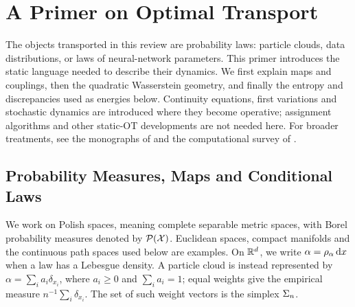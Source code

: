
\section{A Primer on Optimal Transport}
\label{sec-primer-ot}

The objects transported in this review are probability laws: particle clouds, data distributions, or laws of neural-network parameters. This primer introduces the static language needed to describe their dynamics. We first explain maps and couplings, then the quadratic Wasserstein geometry, and finally the entropy and discrepancies used as energies below. Continuity equations, first variations and stochastic dynamics are introduced where they become operative; assignment algorithms and other static-OT developments are not needed here. For broader treatments, see the monographs of \citet{Villani03,Villani09,SantambrogioBook} and the computational survey of \citet{peyre2019computational}.

\subsection{Probability Measures, Maps and Conditional Laws}
\label{sec-measures}

We work on Polish spaces, meaning complete separable metric spaces, with Borel probability measures denoted by $\mathcal{P}(\mathcal{X})$. Euclidean spaces, compact manifolds and the continuous path spaces used below are examples. On $\mathbb{R}^d$, we write $\alpha=\rho_\alpha\,\mathrm{d} x$ when a law has a Lebesgue density. A particle cloud is instead represented by $\alpha=\sum_i a_i\delta_{x_i}$, where $a_i\geq0$ and $\sum_i a_i=1$; equal weights give the empirical measure $n^{-1}\sum_i\delta_{x_i}$. The set of such weight vectors is the simplex $\Sigma_n$.

